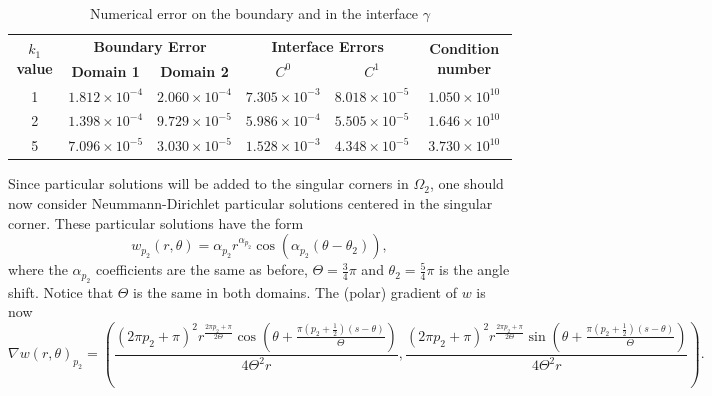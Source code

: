 \begin{table}[!htbp]
    \centering
    \begin{tabular}{cccccc}
      \toprule
      \multirow{2}{*}{\textbf{\(k_1\) value}} & \multicolumn{2}{c}{\textbf{Boundary Error}} & \multicolumn{2}{c}{\textbf{Interface Errors}} & \multirow{2}{*}{\textbf{Condition number}} \\
      \cmidrule(lr){2-3} \cmidrule(lr){4-5}
      & \textbf{Domain 1} & \textbf{Domain 2} & \textbf{\(C^0\)} & \textbf{\(C^1\)} & \\
      \midrule
      1 & $1.812\times10^{-4}$ & $2.060\times10^{-4}$ & $7.305\times10^{-3}$ & $8.018\times10^{-5}$ & $1.050\times 10^{10}$ \\
      2 & $1.398\times10^{-4}$ & $9.729\times10^{-5}$ & $5.986\times10^{-4}$ & $5.505\times10^{-5}$ & $1.646\times 10^{10}$ \\
      5 & $7.096\times10^{-5}$ & $3.030\times10^{-5}$ & $1.528\times10^{-3}$ & $4.348\times10^{-5}$ & $3.730\times 10^{10}$ \\
      \bottomrule
    \end{tabular}
    \caption{Numerical error on the boundary and in the interface \(\gamma\)}
    \label{tab:transmission_results_L_shape_axis}
\end{table}

Since particular solutions will be added to the singular corners in \(\Omega_2\), one should now consider Neummann-Dirichlet particular solutions centered in the singular corner. These particular solutions have the form
\[
    w_{p_2}(r,\theta) = \alpha_{p_2} r^{\alpha_{p_2}}\cos(\alpha_{p_2}(\theta-\theta_2)),
\]
where the \(\alpha_{p_2}\) coefficients are the same as before, \(\Theta = \frac{3}{4}\pi\) and \(\theta_2=\frac{5}{4}\pi\) is the angle shift. Notice that \(\Theta\) is the same in both domains. The (polar) gradient of \(w\) is now
\begin{equation*}
    \nabla w(r,\theta)_{p_2} = \left(\frac{(2 \pi  {p_2}+\pi )^2 r^{\frac{2 \pi  {p_2}+\pi }{2 \Theta }} \cos \left(\theta +\frac{\pi  \left({p_2}+\frac{1}{2}\right) (s-\theta )}{\Theta }\right)}{4 \Theta ^2 r},\frac{(2 \pi  {p_2}+\pi )^2 r^{\frac{2 \pi  {p_2}+\pi }{2 \Theta }} \sin \left(\theta +\frac{\pi  \left({p_2}+\frac{1}{2}\right) (s-\theta )}{\Theta }\right)}{4 \Theta ^2 r}\right).
\end{equation*}

